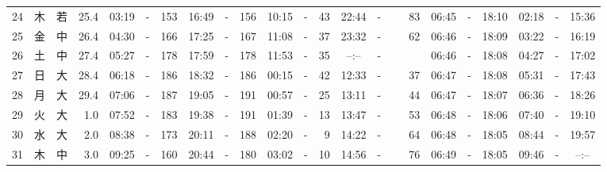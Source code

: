 \documentclass[12pt,a4j]{jsarticle}
\begin{document}
\begin{table}[htbp]
\begin{center}
{\begin{tabular}{|rc|cr|ccrccr|ccrccr|ccc|ccc|}
24 & 木 & 若 & 25.4 &  03:19 &-& 153 &  16:49 &-& 156 &  10:15 &-&  43 &  22:44 &-&  83 & 06:45 & -& 18:10 & 02:18 & -& 15:36 \\
25 & 金 & 中 & 26.4 &  04:30 &-& 166 &  17:25 &-& 167 &  11:08 &-&  37 &  23:32 &-&  62 & 06:46 & -& 18:09 & 03:22 & -& 16:19 \\
26 & 土 & 中 & 27.4 &  05:27 &-& 178 &  17:59 &-& 178 &  11:53 &-&  35 &  --:-- &-&~~~~~ & 06:46 & -& 18:08 & 04:27 & -& 17:02 \\
27 & 日 & 大 & 28.4 &  06:18 &-& 186 &  18:32 &-& 186 &  00:15 &-&  42 &  12:33 &-&  37 & 06:47 & -& 18:08 & 05:31 & -& 17:43 \\
28 & 月 & 大 & 29.4 &  07:06 &-& 187 &  19:05 &-& 191 &  00:57 &-&  25 &  13:11 &-&  44 & 06:47 & -& 18:07 & 06:36 & -& 18:26 \\
29 & 火 & 大 &  1.0 &  07:52 &-& 183 &  19:38 &-& 191 &  01:39 &-&  13 &  13:47 &-&  53 & 06:48 & -& 18:06 & 07:40 & -& 19:10 \\
30 & 水 & 大 &  2.0 &  08:38 &-& 173 &  20:11 &-& 188 &  02:20 &-&   9 &  14:22 &-&  64 & 06:48 & -& 18:05 & 08:44 & -& 19:57 \\
31 & 木 & 中 &  3.0 &  09:25 &-& 160 &  20:44 &-& 180 &  03:02 &-&  10 &  14:56 &-&  76 & 06:49 & -& 18:05 & 09:46 & -& --:-- \\
   \hline
   \end{tabular}}
   \end{center}
\end{table}
\newpage
\end{document}
